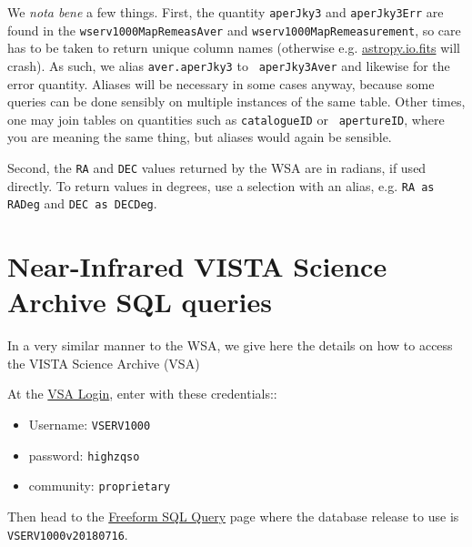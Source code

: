 \documentclass[usenatbib]{mnras}
\begin{document}
We {\it nota bene} a few things. First, the quantity {\tt aperJky3}
and {\tt aperJky3Err} are found in the {\tt wserv1000MapRemeasAver}
and {\tt wserv1000MapRemeasurement}, so care has to be taken to return
unique column names (otherwise e.g.
\href{http://docs.astropy.org/en/stable/io/fits/}{astropy.io.fits}
will crash).  As such, we alias {\tt aver.aperJky3} to {\tt
aperJky3Aver} and likewise for the error quantity. Aliases will be
necessary in some cases anyway, because some queries can be done
sensibly on multiple instances of the same table. Other times, one may
join tables on quantities such as {\tt catalogueID} or {\tt
apertureID}, where you are meaning the same thing, but aliases would
again be sensible.

Second, the {\tt RA} and {\tt DEC} values returned by the WSA are in radians, if
used directly. To return values in degrees, use a selection with an alias, e.g. 
{\tt RA as RADeg} and {\tt DEC as DECDeg}.

\onecolumn

\twocolumn


\section{Near-Infrared VISTA Science Archive SQL queries}\label{sec:SQL}
In a very similar manner to the WSA, we give here the details on how to access
the VISTA Science Archive (VSA)

At the \href{http://horus.roe.ac.uk/vsa/login.html}{VSA Login}, enter 
with these credentials::
\begin{itemize}
    \item Username: {\tt VSERV1000} 
    \item password: {\tt highzqso} 
    \item community: {\tt proprietary}
\end{itemize}
Then head to the \href{http://horus.roe.ac.uk:8080/vdfs/VSQL_form.jsp}{Freeform SQL Query} page where the database release to use is {\tt VSERV1000v20180716}. 

\onecolumn

\twocolumn










%


\end{document}
